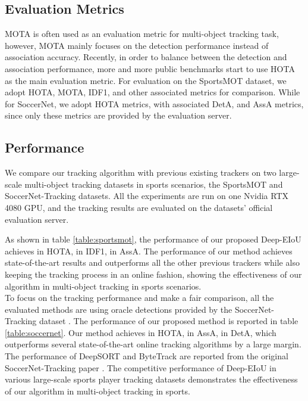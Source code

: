 \documentclass[10pt,twocolumn,letterpaper]{article}
\begin{document}
\subsection{Evaluation Metrics}
MOTA \cite{mota} is often used as an evaluation metric for multi-object tracking task, however, MOTA mainly focuses on the detection performance instead of association accuracy. Recently, in order to balance between the detection and association performance, more and more public benchmarks start to use HOTA \cite{luiten2021hota} as the main evaluation metric. For evaluation on the SportsMOT dataset, we adopt HOTA, MOTA, IDF1, and other associated metrics \cite{bernardin2008evaluating} for comparison. While for SoccerNet, we adopt HOTA metrics, with associated DetA, and AssA metrics, since only these metrics are provided by the evaluation server.


\subsection{Performance}
We compare our tracking algorithm with previous existing trackers on two large-scale multi-object tracking datasets in sports scenarios, the SportsMOT and SoccerNet-Tracking datasets. All the experiments are run on one Nvidia RTX 4080 GPU, and the tracking results are evaluated on the datasets' official evaluation server.

 As shown in table \ref{table:sportsmot}, the performance of our proposed Deep-EIoU achieves  in HOTA,  in IDF1,  in AssA. The performance of our method achieves state-of-the-art results and outperforms all the other previous trackers while also keeping the tracking process in an online fashion, showing the effectiveness of our algorithm in multi-object tracking in sports scenarios.\\

 To focus on the tracking performance and make a fair comparison, all the evaluated methods are using oracle detections provided by the SoccerNet-Tracking dataset \cite{cioppa2022soccernet}. The performance of our proposed method is reported in table \ref{table:soccernet}. Our method achieves  in HOTA,  in AssA,  in DetA, which outperforms several state-of-the-art online tracking algorithms by a large margin. The performance of DeepSORT and ByteTrack are reported from the original SoccerNet-Tracking paper \cite{cioppa2022soccernet}. The competitive performance of Deep-EIoU in various large-scale sports player tracking datasets demonstrates the effectiveness of our algorithm in multi-object tracking in sports.
\end{document}
